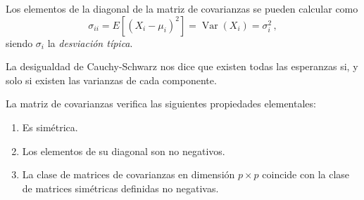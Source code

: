 \begin{nota}
  Los elementos de la diagonal de la matriz de covarianzas se pueden calcular como \[\sigma_{ii}=E\left[(X_i - \mu_i)^2\right] = \operatorname{Var}(X_i) = \sigma_i^2\,,\]siendo $\sigma_i$ la \emph{desviación típica}.
\end{nota}

\begin{nota}
  La desigualdad de Cauchy-Schwarz nos dice que existen todas las esperanzas si, y solo si existen las varianzas de cada componente.
\end{nota}

\begin{nprop}
  La matriz de covarianzas verifica las siguientes propiedades elementales:
  \begin{enumerate}
    \item Es simétrica.
    \item Los elementos de su diagonal son no negativos.
    \item La clase de matrices de covarianzas en dimensión $p\times p$ coincide con la clase de matrices simétricas definidas no negativas.
    \end{enumerate}
  \end{nprop}

